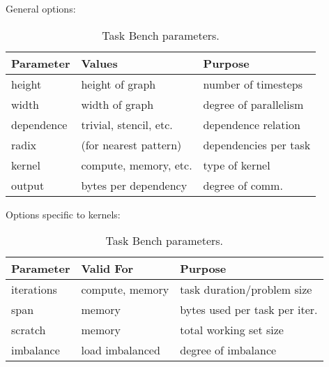 \begin{table}[t]
\small

General options:

\vspace{0.25em}

\begin{tabular}{l | l | l}
Parameter & Values & Purpose \\
\hline

height & height of graph & number of timesteps \\
width & width of graph & degree of parallelism \\
dependence & trivial, stencil, etc. & dependence relation \\
\quad \raisebox{0.35ex}{$\llcorner$} radix & (for nearest pattern) & dependencies per task \\
kernel & compute, memory, etc. & type of kernel \\
output & bytes per dependency & degree of comm.
\end{tabular}

\vspace{1em}

Options specific to kernels:

\vspace{0.25em}

\begin{tabular}{l | l | l}
Parameter & Valid For & Purpose \\
\hline
iterations & compute, memory & task duration/problem size \\
span & memory & bytes used per task per iter. \\
scratch & memory & total working set size \\
imbalance & load imbalanced & degree of imbalance
\end{tabular}

\caption{Task Bench parameters.\label{tab:parameters}}
\vspace{-0.5cm}
\end{table}
